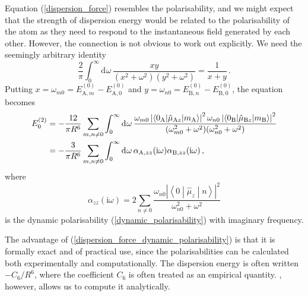 \documentclass{article}
\theoremstyle{plain}\theoremheaderfont{\normalfont\itshape}\theorembodyfont{\rmfamily}\theoremseparator{.}\newtheorem*{rem}{Remark}\newtheorem*{ex}{Example}\newtheorem*{proof}{Proof}\newtheorem*{altp}{Alternative proof}
\theoremstyle{plain}\theoremheaderfont{\normalfont\bfseries}\theorembodyfont{\rmfamily}\theoremseparator{.}\newtheorem{thm}{Theorem}[section]\newtheorem{lem}[thm]{Lemma}\newtheorem{prop}[thm]{Proposition}\newtheorem*{cor}{Corollary}\newtheorem{defn}[thm]{Definition}\newtheorem{clm}[thm]{Claim}\newtheorem{clminproof}{Claim}
\theoremstyle{break}\theoremheaderfont{\normalfont\itshape}\theorembodyfont{\rmfamily}\theoremseparator{.\medskip}\newtheorem*{proofskip}{Proof}\newtheorem*{exs}{Examples}\newtheorem*{rems}{Remarks}
\theoremstyle{break}\theoremheaderfont{\normalfont\bfseries}\theorembodyfont{\rmfamily}\theoremseparator{.\medskip}\newtheorem{lemskip}[thm]{Lemma}\newtheorem{defnskip}[thm]{Definition}\newtheorem{propskip}[thm]{Proposition}\newtheorem{thmskip}[thm]{Theorem}
\numberwithin{equation}{section}
\newcommand{\ii}{\mathrm{i}}
\newcommand{\dd}[2][]{\mathrm{d}^{#1} #2\,}
\newcommand{\mel}[3]{\left\langle #1 \middle| #2 \middle| #3 \right\rangle}
\newcommand{\abs}[1]{\left| #1 \right|}
\renewcommand{\AA}{\mathrm{A}}
\newcommand{\BB}{\mathrm{B}}
\begin{document}
    Equation (\ref{dispersion_force}) resembles the polarisability, and we might expect that the strength of dispersion energy would be related to the polarisability of the atom as they need to respond to the instantaneous field generated by each other. However, the connection is not obvious to work out explicitly. We need the seemingly arbitrary identity
    \begin{equation}
        \frac{2}{\pi}\int_{0}^{\infty}\dd{\omega}\frac{xy}{(x^2+\omega^2)(y^2+\omega^2)}=\frac{1}{x+y}\,.\label{an_integral_identity}
    \end{equation}
    Putting \(x=\omega_{m0}=E_{\AA,m}^{(0)}-E_{\AA,0}^{(0)}\) and \(y=\omega_{n0}=E_{\BB,n}^{(0)}-E_{\BB,0}^{(0)}\), the equation becomes
    \begin{align}
        E_0^{(2)}&=-\frac{12}{\pi R^6}\sum_{m,n\ne 0}\int_{0}^{\infty}\dd{\omega}\frac{\omega_{m0}\abs{\mel{0_{\AA}}{\hat{\mu}_{\AA z}}{m_{\AA}}}^2\omega_{n0}\abs{\mel{0_{\BB}}{\hat{\mu}_{\BB z}}{m_{\BB}}}^2}{(\omega_{m0}^2+\omega^2)(\omega_{n0}^2+\omega^2)}\notag\\
        &=-\frac{3}{\pi R^6}\sum_{m,n\ne 0}\int_{0}^{\infty}\dd{\omega}\alpha_{\AA,zz}(\ii\omega)\alpha_{\BB,zz}(\ii\omega)\,,\label{dispersion_force_dynamic_polarisability}
    \end{align}
    where
    \begin{equation}\label{dynamic_polarisability_imaginary_frequency}
        \alpha_{zz}(\ii\omega)=2\sum_{n\ne 0}\frac{\omega_{n0}\abs{\mel{0}{\hat{\mu}_z}{n}}^2}{\omega_{n0}^2+\omega^2}
    \end{equation}
    is the dynamic polarisability (\ref{dynamic_polarisability}) with imaginary frequency. 

    The advantage of (\ref{dispersion_force_dynamic_polarisability}) is that it is formally exact and of practical use, since the polarisabilities can be calculated both experimentally and computationally. The dispersion energy is often written \(-C_6/R^6\), where the coefficient \(C_6\) is often treated as an empirical quantity. , however, allows us to compute it analytically.
\end{document}
